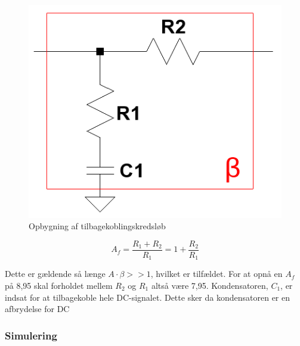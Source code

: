 \begin{figure}[h]
\centering
\includegraphics[scale=0.4]{teknisk/effektforstaerker/beta-clean.png}
\caption{Opbygning af tilbagekoblingskredsløb}
\label{fig:beta-clean}
\end{figure} 

\begin{equation}
\label{equ:af-deler}
A_f = \frac{R_1 + R_2}{R_1} = 1 + \frac{R_2}{R_1}
\end{equation}

Dette er gældende så længe $A \cdot \beta >> 1$, hvilket er tilfældet. For at opnå en $A_f$ på 8,95 skal forholdet mellem $R_2$ og $R_1$ altså være 7,95. Kondensatoren, $C_1$, er indsat for at tilbagekoble hele DC-signalet. Dette sker da kondensatoren er en afbrydelse for DC

\subsubsection*{Simulering}